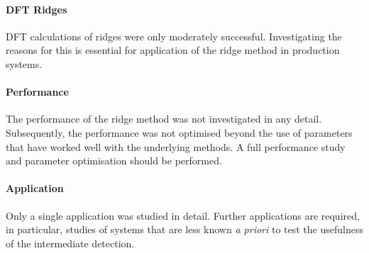 \paragraph{DFT Ridges}
DFT calculations of ridges were only moderately successful.
Investigating the reasons for this is essential for application of the ridge method in production systems.

\paragraph{Performance}
The performance of the ridge method was not investigated in any detail.
Subsequently, the performance was not optimised beyond the use of parameters that have worked well with the underlying methods.
A full performance study and parameter optimisation should be performed.

\paragraph{Application}
Only a single application was studied in detail.
Further applications are required, in particular, studies of systems that are less known \textit{a priori} to test the usefulness of the intermediate  detection.
